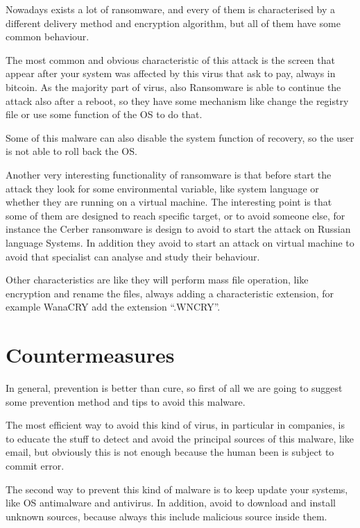 \documentclass{article}
\begin{document}
    Nowadays exists a lot of ransomware, and every of them is characterised by a different delivery method and encryption algorithm, but all of them have some common behaviour.
    
    The most common and obvious characteristic of this attack is the screen that appear after your system was affected by this virus that ask to pay, always in bitcoin.
    As the majority part of virus, also Ransomware is able to continue the attack also after a reboot, so they have some mechanism like change the registry file or use some function of the OS to do that.
    
    Some of this malware can also disable the system function of recovery, so the user is not able to roll back the OS.
    
    Another very interesting functionality of ransomware is that before start the attack they look for some environmental variable, like system language or whether they are running on a virtual machine. The interesting point is that some of them are designed to reach specific target, or to avoid someone else, for instance the Cerber ransomware is design to avoid to start the attack on Russian language Systems. In addition they avoid to start an attack on virtual machine to avoid that specialist can analyse and study their behaviour. \cite{cit8}
    
    Other characteristics are like they will perform mass file operation, like encryption and rename the files, always adding a characteristic extension, for example WanaCRY add the extension “.WNCRY”. \cite{cit11}

    
\section{Countermeasures}
    In general, prevention is better than cure, so first of all we are going to suggest some prevention method and tips to avoid this malware.

    The most efficient way to avoid this kind of virus, in particular in companies,  is to educate the stuff to detect and avoid the principal sources of this malware, like email, but obviously this is not enough because the human been is subject to commit error. 
    
    The second way to prevent this kind of malware is to keep update your systems, like OS antimalware and antivirus. In addition, avoid to download and install unknown sources, because always this include malicious source inside them.
    
\end{document}
